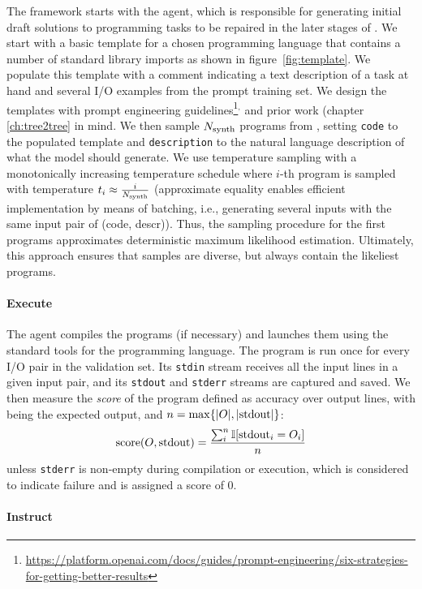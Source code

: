 The framework starts with the \synthesize{} agent, which is responsible for generating initial draft solutions to programming tasks to be repaired in the later stages of \method{}.
We start with a basic template for a chosen programming language that contains a number of standard library imports as shown in figure~\ref{fig:template}.
We populate this template with a comment indicating a text description of a task at hand and several I/O examples from the prompt training set.
We design the templates with prompt engineering guidelines\footnote{\url{https://platform.openai.com/docs/guides/prompt-engineering/six-strategies-for-getting-better-results}}$^{,}$ and prior work (chapter \ref{ch:tree2tree} in mind.
We then sample $N_\text{synth}{}$ programs from \synthmodel{}, setting \texttt{code} to the populated template and \texttt{description} to the natural language description of what the model should generate.
We use temperature sampling with a monotonically increasing temperature schedule where $i$-th program is sampled with temperature $t_i \approx \frac{i}{N_\text{synth}{}}$ (approximate equality enables efficient implementation by means of batching, i.e., generating several inputs with the same input pair of (code, descr)).
Thus, the sampling procedure for the first programs approximates deterministic maximum likelihood estimation.
Ultimately, this approach ensures that samples are diverse, but always contain the likeliest programs.

\paragraph{Execute}
\label{sec:execute}

The \execute{} agent compiles the programs (if necessary) and launches them using the standard tools for the programming language.
The program is run once for every I/O pair in the validation set. 
Its \texttt{stdin} stream receives all the input lines in a given input pair, and its \texttt{stdout} and \texttt{stderr} streams are captured and saved.
We then measure the \emph{score} of the program defined as accuracy over output lines, with \expectedoutput{} being the expected output, and $n=\max\{|O{}|, |\text{stdout}|\}$:
\[    
\text{score}(O{}, \text{stdout}) = \frac{\sum^{n}_i{\mathbb{I}[\text{stdout}_i = O_i]}}{n} 
\]
unless \texttt{stderr} is non-empty during compilation or execution, which is considered to indicate failure and is assigned a score of 0.

\paragraph{Instruct}
\label{sec:instruct}

